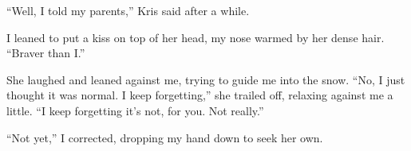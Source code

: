 ``Well, I told my parents,'' Kris said after a while.

I leaned to put a kiss on top of her head, my nose warmed by her dense hair.  ``Braver than I.''

She laughed and leaned against me, trying to guide me into the snow.  ``No, I just thought it was normal.  I keep forgetting,'' she trailed off, relaxing against me a little.  ``I keep forgetting it's not, for you.  Not really.''

``Not yet,'' I corrected, dropping my hand down to seek her own.
